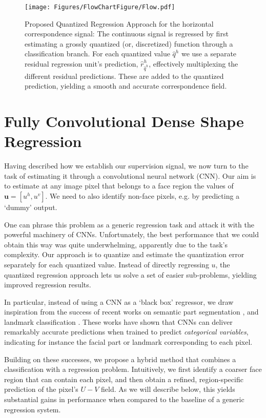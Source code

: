 \documentclass[10pt,twocolumn,letterpaper]{article}
\begin{document}
\begin{figure*}[t]
\centering
\texttt{[image: Figures/FlowChartFigure/Flow.pdf]}
\caption{Proposed Quantized Regression Approach for the horizontal correspondence signal: The continuous  signal is regressed by first estimating a grossly quantized (or, discretized) function  through a classification branch. For each quantized value $\hat{q}^h$ we use a separate residual regression unit's prediction, $\hat{r}^h_{\hat{q}^h}$, effectively multiplexing the different residual predictions. These are added to the quantized prediction, yielding a smooth and accurate correspondence field. }
\vspace{-0.35cm}
\label{fig:Pipeline}
\end{figure*}\section{Fully Convolutional Dense Shape Regression }\label{sec:quantized}%

	Having described how we establish our supervision signal, we now turn to the task of estimating it through a convolutional neural network (CNN). 
		Our aim is to estimate at any image pixel that belongs to a face region the values of  $\bm{u} =[u^h, u^v]$. We need to also identify non-face pixels,  e.g. by predicting a `dummy' output. 
		
	One can phrase this problem as a generic regression task and attack it with the powerful machinery of CNNs. Unfortunately, the best performance that we could obtain this way was quite underwhelming, apparently due to the task's complexity. Our approach is to quantize and estimate the quantization error separately for each quantized value. Instead of directly regressing $u$, the quantized regression approach lets us solve a set of easier sub-problems, yielding improved regression results.

	
In particular,	instead of  using a CNN as a `black box' regressor, we draw inspiration from the success of recent works on semantic part  segmentation \cite{tsogkas2015deep,CP2016Deeplab}, and landmark classification \cite{bulat2016human,bulat2016two}. These works have shown that CNNs can deliver remarkably accurate predictions when trained to predict \textit{categorical variables}, indicating for instance the facial part or landmark corresponding to each pixel. 
	
	Building on these successes, we propose a hybrid method that combines a classification with a regression problem. Intuitively, we first identify a coarser face region that can contain each pixel, and then obtain a refined, region-specific prediction of the pixel's $U-V$  field. As we will describe below, this yields substantial gains in performance when compared to the baseline of a generic regression system. 
	
\end{document}
